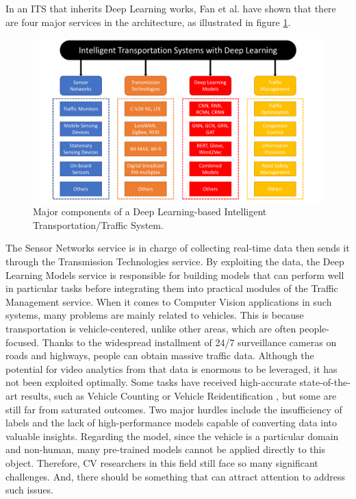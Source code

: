 In an ITS that inherits Deep Learning works, Fan et al. \cite{fan2020deep} have shown that there are four major services in the architecture, as illustrated in figure \ref{fig:ITS_structure}.
\begin{figure}[!t]
    \centering
    \includegraphics[width=\linewidth]{images/overview/ITS_structure.pdf}
    \caption{Major components of a Deep Learning-based Intelligent Transportation/Traffic System.}
    \label{fig:ITS_structure}
\end{figure}
The Sensor Networks service is in charge of collecting real-time data then sends it through the Transmission Technologies service.
By exploiting the data, the Deep Learning Models service is responsible for building models that can perform well in particular tasks before integrating them into practical modules of the Traffic Management service.
When it comes to Computer Vision applications in such systems, many problems are mainly related to vehicles.
This is because transportation is vehicle-centered, unlike other areas, which are often people-focused.
Thanks to the widespread installment of 24/7 surveillance cameras on roads and highways, people can obtain massive traffic data.
Although the potential for video analytics from that data is enormous to be leveraged, it has not been exploited optimally.
Some tasks have received high-accurate state-of-the-art results, such as Vehicle Counting \cite{lu2021robust, dai2019video, asha2018vehicle} or Vehicle Reidentification \cite{luo2021empirical, Khorramshahi_2019_ICCV, zhu2019vehicle}, but some are still far from saturated outcomes.
Two major hurdles include the insufficiency of labels and the lack of high-performance models capable of converting data into valuable insights.
Regarding the model, since the vehicle is a particular domain and non-human, many pre-trained models cannot be applied directly to this object.
Therefore, CV researchers in this field still face so many significant challenges.
And, there should be something that can attract attention to address such issues.

